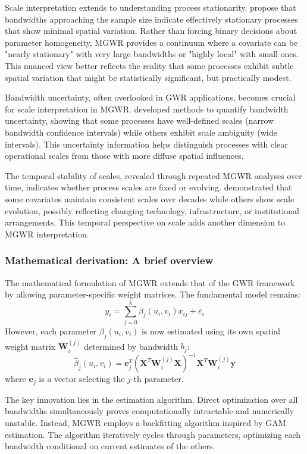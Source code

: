 \documentclass[smallextended, natbib]{svjour3}       %
\begin{document}
Scale interpretation extends to understanding process stationarity. 
\cite{Fotheringham2017} propose that bandwidths approaching the sample size indicate effectively stationary processes that show minimal spatial variation. 
Rather than forcing binary decisions about parameter homogeneity, MGWR provides a continuum where a covariate can be "nearly stationary" with very large bandwidths or "highly local" with small ones. 
This nuanced view better reflects the reality that some processes exhibit subtle spatial variation that might be statistically significant, but practically modest.

Bandwidth uncertainty, often overlooked in GWR applications, becomes crucial for scale interpretation in MGWR. 
\cite{li2020measuring} developed methods to quantify bandwidth uncertainty, showing that some processes have well-defined scales (narrow bandwidth confidence intervals) while others exhibit scale ambiguity (wide intervals). 
This uncertainty information helps distinguish processes with clear operational scales from those with more diffuse spatial influences.

The temporal stability of scales, revealed through repeated MGWR analyses over time, indicates whether process scales are fixed or evolving. 
\cite{wolf2021place} demonstrated that some covariates maintain consistent scales over decades while others show scale evolution, possibly reflecting changing technology, infrastructure, or institutional arrangements. 
This temporal perspective on scale adds another dimension to MGWR interpretation.

\subsubsection*{Mathematical derivation:  A brief overview}

The mathematical formulation of MGWR extends that of the GWR framework by allowing parameter-specific weight matrices. The fundamental model remains:
$$y_i = \sum_{j=0}^{k} \beta_j(u_i, v_i)x_{ij} + \varepsilon_i$$
However, each parameter $\beta_j(u_i, v_i)$ is now estimated using its own spatial weight matrix $\mathbf{W}_i^{(j)}$ determined by bandwidth $b_j$:
$$\hat{\beta}_j(u_i, v_i) = \mathbf{e}_j^T(\mathbf{X}^T\mathbf{W}_i^{(j)}\mathbf{X})^{-1}\mathbf{X}^T\mathbf{W}_i^{(j)}\mathbf{y}$$
where $\mathbf{e}_j$ is a vector selecting the $j$-th parameter.

The key innovation lies in the estimation algorithm. Direct optimization over all bandwidths simultaneously proves computationally intractable and numerically unstable. Instead, MGWR employs a backfitting algorithm inspired by GAM estimation. The algorithm iteratively cycles through parameters, optimizing each bandwidth conditional on current estimates of the others.
\end{document}
